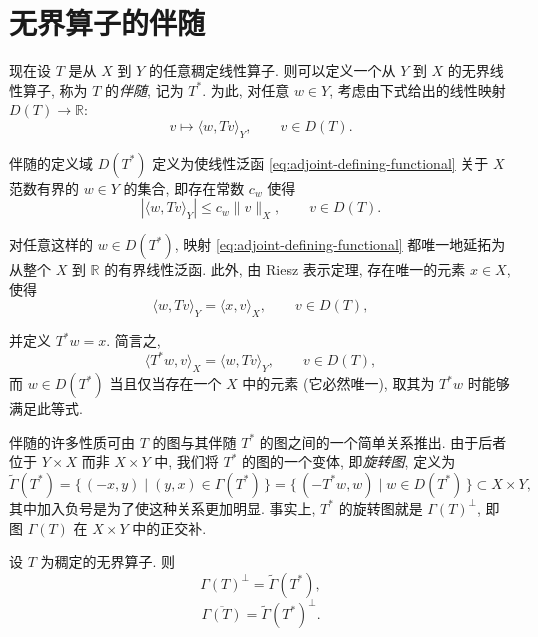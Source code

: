 \section{无界算子的伴随}\label{sec:unbounded-adjoint}

现在设 $T$ 是从 $X$ 到 $Y$ 的任意稠定线性算子. 则可以定义一个从 $Y$ 到 $X$ 的无界线性算子, 称为 $T$ 的\emph{伴随}, 记为 $T^*$. 为此, 对任意 $w\in Y$, 考虑由下式给出的线性映射 $D(T)\to\mathbb R$:
\begin{equation}\label{eq:adjoint-defining-functional}
v\mapsto\langle w,Tv\rangle_Y,\qquad v\in D(T).
\end{equation}

伴随的定义域 $D(T^*)$ 定义为使线性泛函 \eqref{eq:adjoint-defining-functional} 关于 $X$ 范数有界的 $w\in Y$ 的集合, 即存在常数 $c_w$ 使得
\[
|\langle w,Tv\rangle_Y|\leq c_w\|v\|_X,\qquad v\in D(T).
\]

对任意这样的 $w\in D(T^*)$, 映射 \eqref{eq:adjoint-defining-functional} 都唯一地延拓为从整个 $X$ 到 $\mathbb R$ 的有界线性泛函. 此外, 由 Riesz 表示定理, 存在唯一的元素 $x\in X$, 使得
\begin{equation}\label{eq:adjoint-riesz-identity}
\langle w,Tv\rangle_Y=\langle x,v\rangle_X,\qquad v\in D(T),
\end{equation}

并定义 $T^*w=x$. 简言之,
\[
\langle T^*w,v\rangle_X=\langle w,Tv\rangle_Y,\qquad v\in D(T),
\]
而 $w\in D(T^*)$ 当且仅当存在一个 $X$ 中的元素 (它必然唯一), 取其为 $T^*w$ 时能够满足此等式.

伴随的许多性质可由 $T$ 的图与其伴随 $T^*$ 的图之间的一个简单关系推出. 由于后者位于 $Y\times X$ 而非 $X\times Y$ 中, 我们将 $T^*$ 的图的一个变体, 即\emph{旋转图}, 定义为
\[
\widetilde\Gamma(T^*)=\{\,(-x,y)\mid(y,x)\in\Gamma(T^*)\,\}=\{\,(-T^*w,w)\mid w\in D(T^*)\,\}\subset X\times Y,
\]
其中加入负号是为了使这种关系更加明显. 事实上, $T^*$ 的旋转图就是 $\Gamma(T)^\perp$, 即图 $\Gamma(T)$ 在 $X\times Y$ 中的正交补.

\begin{Proposition}\label{prop:adjoint-rotated-graph}
设 $T$ 为稠定的无界算子. 则
\begin{equation}\label{eq:adjoint-rotated-graph}
\Gamma(T)^\perp=\widetilde\Gamma(T^*),
\end{equation}
\begin{equation}\label{eq:graph-closure-rotated-complement}
\overline{\Gamma(T)}=\widetilde\Gamma(T^*)^\perp.
\end{equation}
\end{Proposition}

